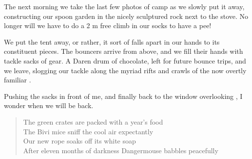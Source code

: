 The next morning we take the last few photos of camp as we slowly put it
away, constructing our spoon garden in the nicely sculptured rock next
to the stove. No longer will we have to do a 2 m free climb in our socks
to have a pee!

We put the tent away, or rather, it sort of falls apart in our hands to
its constituent pieces. The bouncers arrive from above, and we fill
their hands with tackle sacks of gear. A Daren drum of chocolate, left
for future bounce trips, and we leave, slogging our tackle along the
myriad rifts and crawls of the now overtly familiar .

Pushing the sacks in front of me, and finally back to the  window overlooking , I wonder when we will be back.



\begin{verse}
\begin{centering}
The green crates are packed with a year's food\\
The Bivi mice sniff the cool air expectantly\\
Our new rope soaks off its white soap\\
After eleven months of darkness Dangermouse babbles peacefully
 \end{centering} 
\end{verse}

